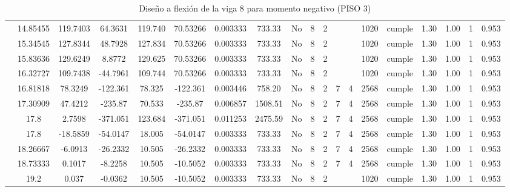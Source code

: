 \begin{table}[H]
{\begin{tabular}{|c|c|c|c|c|c|r|c|c|c|c|c|c|c|c|c|c|c|c|}
\cline{2-19}        & 14.85455 & 119.7403 & 64.3631 & 119.740 & 70.53266 & 0.003333 & 733.33 & No  & 8   & 2   &     &     & 1020 & \cellcolor[rgb]{ .776,  .937,  .808}cumple & 1.30 & 1.00 & 1   & 0.953 \bigstrut\\
\cline{2-19}        & 15.34545 & 127.8344 & 48.7928 & 127.834 & 70.53266 & 0.003333 & 733.33 & No  & 8   & 2   &     &     & 1020 & \cellcolor[rgb]{ .776,  .937,  .808}cumple & 1.30 & 1.00 & 1   & 0.953 \bigstrut\\
\cline{2-19}        & 15.83636 & 129.6249 & 8.8772 & 129.625 & 70.53266 & 0.003333 & 733.33 & No  & 8   & 2   &     &     & 1020 & \cellcolor[rgb]{ .776,  .937,  .808}cumple & 1.30 & 1.00 & 1   & 0.953 \bigstrut\\
\cline{2-19}        & 16.32727 & 109.7438 & -44.7961 & 109.744 & 70.53266 & 0.003333 & 733.33 & No  & 8   & 2   &     &     & 1020 & \cellcolor[rgb]{ .776,  .937,  .808}cumple & 1.30 & 1.00 & 1   & 0.953 \bigstrut\\
\cline{2-19}        & 16.81818 & 78.3249 & -122.361 & 78.325 & -122.361 & 0.003446 & 758.20 & No  & 8   & 2   & 7   & 4   & 2568 & \cellcolor[rgb]{ .776,  .937,  .808}cumple & 1.30 & 1.00 & 1   & 0.953 \bigstrut\\
\cline{2-19}        & 17.30909 & 47.4212 & -235.87 & 70.533 & -235.87 & 0.006857 & 1508.51 & No  & 8   & 2   & 7   & 4   & 2568 & \cellcolor[rgb]{ .776,  .937,  .808}cumple & 1.30 & 1.00 & 1   & 0.953 \bigstrut\\
\cline{2-19}        & \cellcolor[rgb]{ .851,  .882,  .949}17.8 & 2.7598 & -371.051 & 123.684 & -371.051 & 0.011253 & 2475.59 & No  & 8   & 2   & 7   & 4   & 2568 & \cellcolor[rgb]{ .776,  .937,  .808}cumple & 1.30 & 1.00 & 1   & 0.953 \bigstrut\\
\cline{2-19}        & \cellcolor[rgb]{ .851,  .882,  .949}17.8 & -18.5859 & -54.0147 & 18.005 & -54.0147 & 0.003333 & 733.33 & No  & 8   & 2   & 7   & 4   & 2568 & \cellcolor[rgb]{ .776,  .937,  .808}cumple & 1.30 & 1.00 & 1   & 0.953 \bigstrut\\
\cline{2-19}        & 18.26667 & -6.0913 & -26.2332 & 10.505 & -26.2332 & 0.003333 & 733.33 & No  & 8   & 2   & 7   & 4   & 2568 & \cellcolor[rgb]{ .776,  .937,  .808}cumple & 1.30 & 1.00 & 1   & 0.953 \bigstrut\\
\cline{2-19}        & 18.73333 & 0.1017 & -8.2258 & 10.505 & -10.5052 & 0.003333 & 733.33 & No  & 8   & 2   & 7   & 4   & 2568 & \cellcolor[rgb]{ .776,  .937,  .808}cumple & 1.30 & 1.00 & 1   & 0.953 \bigstrut\\
\cline{2-19}        & 19.2 & 0.037 & -0.0362 & 10.505 & -10.5052 & 0.003333 & 733.33 & No  & 8   & 2   &     &     & 1020 & \cellcolor[rgb]{ .776,  .937,  .808}cumple & 1.30 & 1.00 & 1   & 0.953 \bigstrut\\
    \hline
    \end{tabular}%
  }
      \caption{Diseño a flexión de la viga 8 para momento negativo (PISO 3) }
  \label{tab:F VG8 P2 M-}%
\end{table}%
